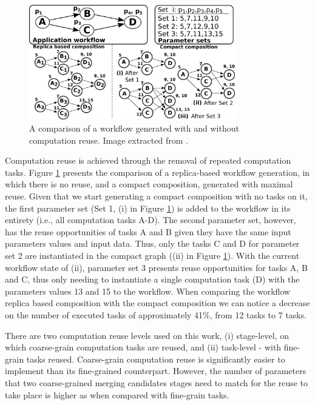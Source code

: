 \begin{figure}[b!]
\begin{center}
\includegraphics[width=0.8\textwidth]{img/reuse.png}
\caption{A comparison of a workflow generated with and without computation reuse. Image extracted from \cite{rtf2}.}
\label{fig:reuse}
\end{center}
\vspace{-4mm}
\end{figure}

Computation reuse is achieved through the removal of repeated computation tasks. Figure \ref{fig:reuse} presents the comparison of a replica-based workflow generation, in which there is no reuse, and a compact composition, generated with maximal reuse. Given that we start generating a compact composition with no tasks on it, the first parameter set (Set 1, (i) in Figure \ref{fig:reuse}) is added to the workflow in its entirety (i.e., all computation tasks A-D). The second parameter set, however, has the reuse opportunities of tasks A and B given they have the same input parameters values and input data. Thus, only the tasks C and D for parameter set 2 are instantiated in the compact graph ((ii) in Figure \ref{fig:reuse}). With the current workflow state of (ii), parameter set 3 presents reuse opportunities for tasks A, B and C, thus only needing to instantiate a single computation task (D) with the parameters values 13 and 15 to the workflow. When comparing the workflow replica based composition with the compact composition we can notice a decrease on the number of executed tasks of approximately 41\%, from 12 tasks to 7 tasks.

There are two computation reuse levels used on this work, (i) stage-level, on which coarse-grain computation tasks are reused, and (ii) task-level - with fine-grain tasks reused. Coarse-grain computation reuse is significantly easier to implement than its fine-grained counterpart. However, the number of parameters that two coarse-grained merging candidates stages need to match for the reuse to take place is higher as when compared with fine-grain tasks.




